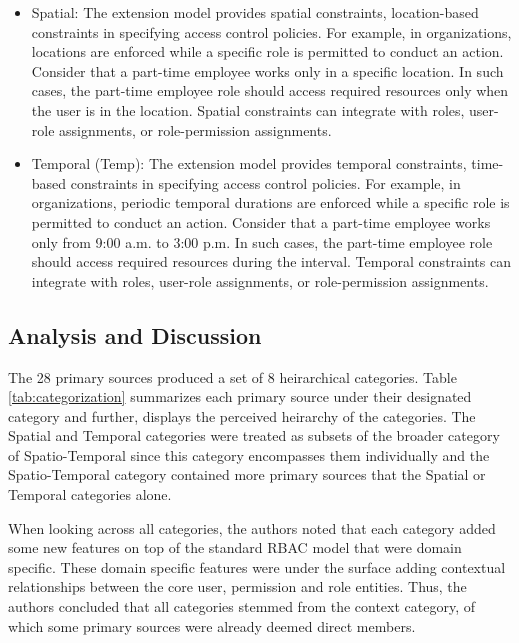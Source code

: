 \begin{itemize}
  \item Spatial: The extension model provides spatial constraints, location-based constraints in specifying access
	control policies. For example, in organizations, locations are enforced while a
	specific role is permitted to conduct an action. Consider that a part-time employee works only in a specific location.
	In such cases, the part-time employee role should access required resources only when the user is in the location. 
	Spatial constraints can integrate with roles, user-role assignments, or role-permission assignments. 

  \item Temporal (Temp):  The extension model provides temporal constraints, time-based constraints in specifying access
	control policies. For example, in organizations, periodic temporal durations are enforced while a
	specific role is permitted to conduct an action. Consider that a part-time employee works only from 9:00 a.m. to 3:00 p.m.
	In such cases, the part-time employee role should access required resources during the interval. 
	Temporal constraints can integrate with roles, user-role assignments, or role-permission assignments.   
	
\end{itemize}

\subsection{Analysis and Discussion}

The 28 primary sources produced a set of 8 heirarchical categories. Table \ref{tab:categorization} summarizes each primary source under their designated
category and further, displays the perceived heirarchy of the categories. 
The Spatial and Temporal categories were treated as subsets of the broader category of Spatio-Temporal since this category encompasses them individually and
the Spatio-Temporal category contained more primary sources that the Spatial or Temporal categories alone.  

When looking across all categories, the authors noted that each category added some new features on top of the standard RBAC model that were domain specific.
These domain specific features were under the surface adding contextual relationships between the core user, permission and role entities.  Thus, the authors
concluded that all categories stemmed from the context category, of which some primary sources were already deemed direct members.  

